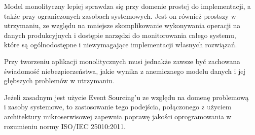 Model monolityczny lepiej sprawdza się przy domenie prostej do implementacji, a także przy ograniczonych zasobach systemowych. Jest on również prostszy w utrzymaniu, ze względu na mniejsze skomplikowanie wykonywania operacji na danych produkcyjnych i dostępie narzędzi do monitorowania całego systemu, które są ogólnodostępne i niewymagające implementacji własnych rozwiązań.

Przy tworzeniu aplikacji monolitycznych musi jednakże zawsze być zachowana świadomość niebezpieczeństwa, jakie wynika z anemicznego modelu danych i jej głębszych problemów w utrzymaniu.

Jeżeli zasadnym jest użycie Event Sourcing'u ze względu na domenę problemową i zasoby systemowe, to zastosowanie tego podejścia, połączonego z użyciem architektury mikroserwisowej zapewnia poprawę jakości oprogramowania w rozumieniu normy ISO/IEC 25010:2011.